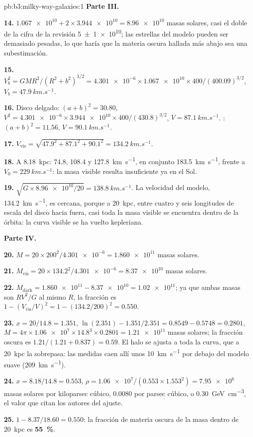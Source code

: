\begin{solution}{pb:b3:milky-way-galaxies:1}
\textbf{Parte III.}

\textbf{14.} $\num{1.067e10} + 2\times\num{3.944e10} = \num{8.96e10}$ masas
solares, casi el doble de la cifra de la revisión \num[separate-uncertainty=true]{5 \pm 1 e10}; las estrellas del modelo
pueden ser demasiado pesadas, lo que haría que la materia oscura hallada más abajo
sea una subestimación.

\textbf{15.} $V_b^2 = GMR^2/(R^2 + b^2)^{3/2} = \num{4.301e-6}\times\num{1.067e10}
\times400/(400.09)^{3/2}$, $V_b = \qty{47.9}{km.s^{-1}}$.

\textbf{16.} Disco delgado: $(a + b)^2 = 30.80$, $V^2 = \num{4.301e-6}\times\num{3.944e10}
\times400/(430.8)^{3/2}$, $V = \qty{87.1}{km.s^{-1}}$. :
$(a + b)^2 = 11.56$, $V = \qty{90.1}{km.s^{-1}}$.

\textbf{17.} $V_\mathrm{vis} = \sqrt{47.9^2 + 87.1^2 + 90.1^2} =
\qty{134.2}{km.s^{-1}}$.

\textbf{18.} A \qty{8.18}{kpc}: 74.8, 108.4 y \qty{127.8}{km.s^{-1}},
en conjunto \qty{183.5}{km.s^{-1}}, frente a $V_0 = \qty{229}{km.s^{-1}}$:
la masa visible resulta insuficiente ya en el Sol.

\textbf{19.} $\sqrt{G\times\num{8.96e10}/20} = \qty{138.8}{km.s^{-1}}$. La
velocidad del modelo, \qty{134.2}{km.s^{-1}}, es cercana, porque a \qty{20}{kpc},
entre cuatro y seis longitudes de escala del disco hacia fuera, casi toda la masa visible se encuentra
dentro de la órbita: la curva visible se ha vuelto kepleriana.

\textbf{Parte IV.}

\textbf{20.} $M = 20\times200^2/\num{4.301e-6} = \num{1.860e11}$ masas solares.

\textbf{21.} $M_\mathrm{vis} = 20\times134.2^2/\num{4.301e-6} = \num{8.37e10}$
masas solares.

\textbf{22.} $M_\mathrm{dark} = \num{1.860e11} - \num{8.37e10} = \num{1.02e11}$;
ya que ambas masas son $RV^2/G$ al mismo $R$, la fracción es
$1 - (V_\mathrm{vis}/V)^2 = 1 - (134.2/200)^2 = \num{0.550}$.

\textbf{23.} $x = 20/14.8 = 1.351$, $\ln(2.351) - 1.351/2.351 = 0.8549 - 0.5748
= 0.2801$, $M = 4\pi\times\num{1.06e7}\times14.8^3\times0.2801 =
\num{1.21e11}$ masas solares; la fracción oscura es
$1.21/(1.21 + 0.837) = \num{0.59}$. El halo se ajusta a toda la
curva, que a \qty{20}{kpc} la sobrepasa: las medidas caen allí
unos \qty{10}{km.s^{-1}} por debajo del modelo suave (\qty{209}{km.s^{-1}}).

\textbf{24.} $x = 8.18/14.8 = 0.553$, $\rho = \num{1.06e7}/(0.553\times1.553^2)
= \num{7.95e6}$ masas solares por kiloparsec cúbico, \num{0.0080} por
parsec cúbico, o \qty{0.30}{GeV.cm^{-3}}, el valor que citan los autores del
ajuste.

\textbf{25.} $1 - 8.37/18.60 = \num{0.550}$: la fracción de materia oscura de la
masa dentro de \qty{20}{kpc} es
\textbf{\qty[text-series-to-math=true]{55}{\percent}}.
\end{solution}
